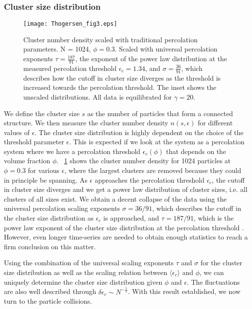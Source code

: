 \documentclass[aps,pre,twocolumn,letterpaper,floatfix,showpacs]{revtex4}
\begin{document}
\subsubsection{Cluster size distribution}
\begin{figure}
\texttt{[image: Thogersen\_fig3.eps]}
\caption{Cluster number density scaled with traditional percolation parameters. N = 1024, $\phi = 0.3$. Scaled with universal percolation exponents $\tau = \frac{187}{91}$, the exponent of the power law distribution at the measured percolation threshold $\epsilon_c = 1.34$, and $\sigma = \frac{36}{91}$, which describes how the cutoff in cluster size diverges as the threshold is increased towards the percolation threshold. The inset shows the unscaled distributions. All data is equilibrated for $\gamma = 20$.
\label{fig:cluster_number_density_epsilon_collapse}}
\end{figure}

We define the cluster size $s$ as the number of particles that form a connected structure. We then measure the cluster number density $n(s,\epsilon)$ for different values of $\epsilon$. The cluster size distribution is highly dependent on the choice of the threshold parameter $\epsilon$.  This is expected if we look at the system as a percolation system where we have a percolation threshold $\epsilon_c(\phi)$ that depends on the volume fraction $\phi$. \figurename~\ref{fig:cluster_number_density_epsilon_collapse} shows the cluster number density for 1024 particles at $\phi = 0.3$ for various $\epsilon$, where the largest clusters are removed because they could in principle be spanning. As $\epsilon$ approaches the percolation threshold $\epsilon_c$, the cutoff in cluster size diverges and we get a power law distribution of cluster sizes, i.e. all clusters of all sizes exist. We obtain a decent collapse of the data using the universal percolation scaling exponents $\sigma = 36/91$, which describes the cutoff in the cluster size distribution as $\epsilon_c$ is approached, and  $\tau = 187/91$, which is the power law exponent of the cluster size distribution at the percolation threshold \cite{stauffer1994introduction}. However, even longer time-series are needed to obtain enough statistics to reach a firm conclusion on this matter.

Using the combination of the universal scaling exponents $\tau$ and $\sigma$ for the cluster size distribution as well as the scaling relation between $\langle \epsilon_c \rangle$ and $\phi$, we can uniquely determine the cluster size distribution given $\phi$ and $\epsilon$. The fluctuations are also well described through $\delta \epsilon_c \sim N^{-\frac{1}{3}}$. With this result established, we now turn to the particle collisions.
\end{document}
